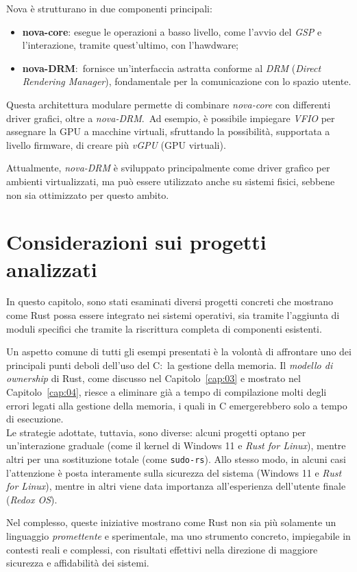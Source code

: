 Nova è strutturano in due componenti principali:
\begin{itemize}
    \item \textbf{nova-core}: esegue le operazioni a basso livello, come l'avvio del \textit{GSP} e l'interazione, tramite quest'ultimo, con l'hawdware;
    \item \textbf{nova-DRM}:\  fornisce un'interfaccia astratta conforme al \textit{DRM} (\textit{Direct Rendering Manager}), fondamentale per la comunicazione con lo spazio utente.
\end{itemize}
Questa architettura modulare permette di combinare \textit{nova-core} con differenti driver grafici, oltre a \textit{nova-DRM}.\ 
Ad esempio, è possibile impiegare \textit{VFIO} per assegnare la GPU a macchine virtuali, sfruttando la possibilità, supportata a livello firmware, di creare più \textit{vGPU} (GPU virtuali). 

Attualmente, \textit{nova-DRM} è sviluppato principalmente come driver grafico per ambienti virtualizzati, ma può essere utilizzato anche su sistemi fisici, sebbene non sia ottimizzato per questo ambito.

\section{Considerazioni sui progetti analizzati}
In questo capitolo, sono stati esaminati diversi progetti concreti 
che mostrano come Rust possa essere integrato nei sistemi operativi, sia 
tramite l'aggiunta di moduli specifici che tramite la riscrittura completa di 
componenti esistenti.

Un aspetto comune di tutti gli esempi presentati è la volontà di affrontare uno dei 
principali punti deboli dell'uso del C:\ la gestione della memoria.
Il \textit{modello di ownership} di Rust, come discusso nel Capitolo~\ref{cap:03} 
e mostrato nel Capitolo~\ref{cap:04}, riesce a 
eliminare già a tempo di compilazione molti degli errori legati alla gestione 
della memoria, i quali in C emergerebbero solo a tempo di esecuzione. \hfill
\vspace{10pt}\\
\noindent Le strategie adottate, tuttavia, sono diverse: alcuni progetti optano 
per un'interazione graduale (come il kernel di Windows 11 e \textit{Rust for Linux}), 
mentre altri per una sostituzione totale (come \texttt{sudo-rs}). 
Allo stesso modo, in alcuni casi l'attenzione è posta interamente sulla 
sicurezza del sistema (Windows 11 e \textit{Rust for Linux}), mentre in altri viene 
data importanza all'esperienza dell'utente finale (\textit{Redox OS}).

Nel complesso, queste iniziative mostrano come Rust non sia più solamente un 
linguaggio \textit{promettente} e sperimentale, ma uno strumento concreto, impiegabile
in contesti reali e complessi, con risultati effettivi nella direzione 
di maggiore sicurezza e affidabilità dei sistemi.